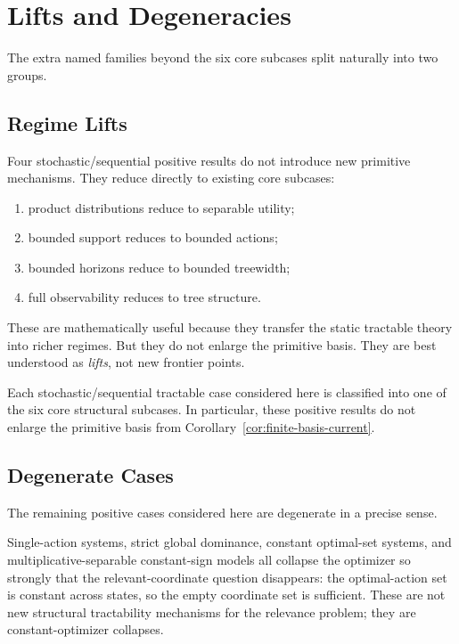 \section{Lifts and Degeneracies}

The extra named families beyond the six core subcases split naturally into two groups.

\subsection*{Regime Lifts}

Four stochastic/sequential positive results do not introduce new primitive mechanisms. They reduce directly to existing core subcases:
\begin{enumerate}
\item product distributions reduce to separable utility;
\item bounded support reduces to bounded actions;
\item bounded horizons reduce to bounded treewidth;
\item full observability reduces to tree structure.
\end{enumerate}

These are mathematically useful because they transfer the static tractable theory into richer regimes. But they do not enlarge the primitive basis. They are best understood as \emph{lifts}, not new frontier points.

\begin{proposition}\label{prop:lifts-no-new-primitive}
Each stochastic/sequential tractable case considered here is classified into one of the six core structural subcases. In particular, these positive results do not enlarge the primitive basis from Corollary~\ref{cor:finite-basis-current}.
\end{proposition}

\subsection*{Degenerate Cases}

The remaining positive cases considered here are degenerate in a precise sense.

Single-action systems, strict global dominance, constant optimal-set systems, and multiplicative-separable constant-sign models all collapse the optimizer so strongly that the relevant-coordinate question disappears: the optimal-action set is constant across states, so the empty coordinate set is sufficient. These are not new structural tractability mechanisms for the relevance problem; they are constant-optimizer collapses.

